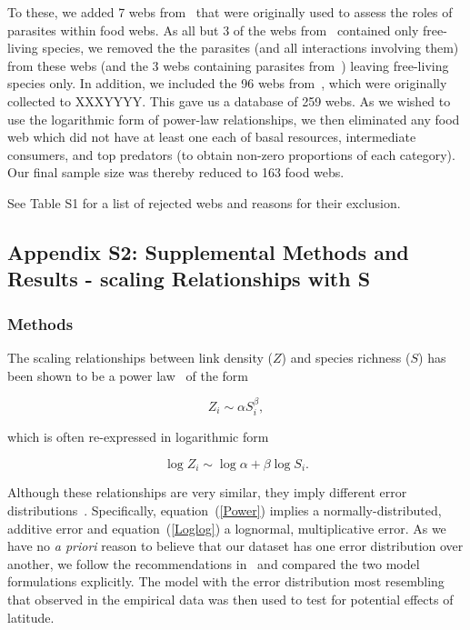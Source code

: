 \documentclass[12pt]{article}
\begin{document}
  To these, we added 7 webs from~\citet{Dunne2013} that were originally used to assess the roles
  of parasites within food webs. As all but 3 of the webs from~\citet{GlobalWeb} contained only
  free-living species, we removed the the parasites (and all interactions involving them) from
  these webs (and the 3 webs containing parasites from~\citet{GlobalWeb}) leaving free-living 
  species only. In addition, we included the 96 webs from~\citet{Brose2006}, which were originally
  collected to XXXYYYY. This gave us a database of 259 webs. As we wished to use the
  logarithmic form of power-law relationships, we then eliminated any food web which did not have
  at least one each of basal resources, intermediate consumers, and top predators (to obtain non-zero
  proportions of each category). Our final sample size was thereby reduced to 163 food webs.


 See Table S1 for a list of rejected webs and reasons for their
  exclusion. 


\subsection*{Appendix S2: Supplemental Methods and Results - scaling Relationships with S}

  \subsubsection*{Methods}

    The scaling relationships between link density ($Z$) and species richness ($S$)
    has been shown to be a power law~\citep{Riede2010} of the form 

    \begin{equation}
    \label{Power}
    Z_{i} \sim \alpha S_{i}^{\beta}  ,
    \end{equation}

    \noindent which is often re-expressed in logarithmic form 

    \begin{equation}
    \label{Loglog}
    \log{Z_{i}} \sim \log{\alpha} + \beta\log{S_{i}}  .
    \end{equation}

    \noindent Although these relationships are very similar, they imply different error distributions~\citep{Xiao2011}.
    Specifically, equation~(\ref{Power}) implies a normally-distributed, additive error and equation~(\ref{Loglog}) a lognormal,
    multiplicative error. As we have no \emph{a priori} reason to believe that our dataset has one error distribution
    over another, we follow the recommendations in~\citet{Xiao2011} and compared the two
    model formulations explicitly. The model with the error distribution most resembling that observed in the empirical
    data was then used to test for potential effects of latitude.
\end{document}
